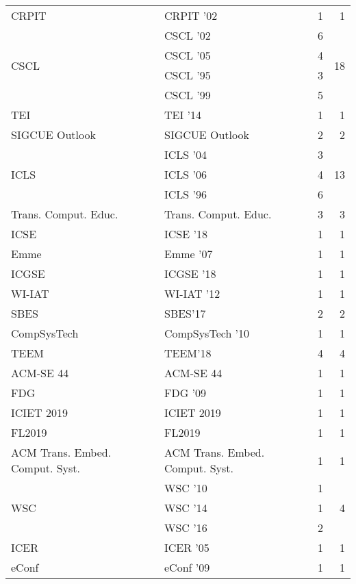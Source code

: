 \begin{table*}[t]
\begin{tabular}{llrr}
\multirow{1}{*}{CRPIT } & CRPIT '02 & 1 & \multirow{1}{*}{1}\\
\multirow{4}{*}{CSCL } & CSCL '02 & 6 & \multirow{4}{*}{18}\\
& CSCL '05 & 4 &\\
& CSCL '95 & 3 &\\
& CSCL '99 & 5 &\\
\multirow{1}{*}{TEI } & TEI '14 & 1 & \multirow{1}{*}{1}\\
\multirow{1}{*}{SIGCUE Outlook} & SIGCUE Outlook & 2 & \multirow{1}{*}{2}\\
\multirow{3}{*}{ICLS } & ICLS '04 & 3 & \multirow{3}{*}{13}\\
& ICLS '06 & 4 &\\
& ICLS '96 & 6 &\\
\multirow{1}{*}{Trans. Comput. Educ.} & Trans. Comput. Educ. & 3 & \multirow{1}{*}{3}\\
\multirow{1}{*}{ICSE } & ICSE '18 & 1 & \multirow{1}{*}{1}\\
\multirow{1}{*}{Emme } & Emme '07 & 1 & \multirow{1}{*}{1}\\
\multirow{1}{*}{ICGSE } & ICGSE '18 & 1 & \multirow{1}{*}{1}\\
\multirow{1}{*}{WI-IAT } & WI-IAT '12 & 1 & \multirow{1}{*}{1}\\
\multirow{1}{*}{SBES} & SBES'17 & 2 & \multirow{1}{*}{2}\\
\multirow{1}{*}{CompSysTech } & CompSysTech '10 & 1 & \multirow{1}{*}{1}\\
\multirow{1}{*}{TEEM} & TEEM'18 & 4 & \multirow{1}{*}{4}\\
\multirow{1}{*}{ACM-SE 44} & ACM-SE 44 & 1 & \multirow{1}{*}{1}\\
\multirow{1}{*}{FDG } & FDG '09 & 1 & \multirow{1}{*}{1}\\
\multirow{1}{*}{ICIET 2019} & ICIET 2019 & 1 & \multirow{1}{*}{1}\\
\multirow{1}{*}{FL2019} & FL2019 & 1 & \multirow{1}{*}{1}\\
\multirow{1}{*}{ACM Trans. Embed. Comput. Syst.} & ACM Trans. Embed. Comput. Syst. & 1 & \multirow{1}{*}{1}\\
\multirow{3}{*}{WSC } & WSC '10 & 1 & \multirow{3}{*}{4}\\
& WSC '14 & 1 &\\
& WSC '16 & 2 &\\
\multirow{1}{*}{ICER } & ICER '05 & 1 & \multirow{1}{*}{1}\\
\multirow{1}{*}{eConf } & eConf '09 & 1 & \multirow{1}{*}{1}\\

\end{tabular}
\end{table*}
